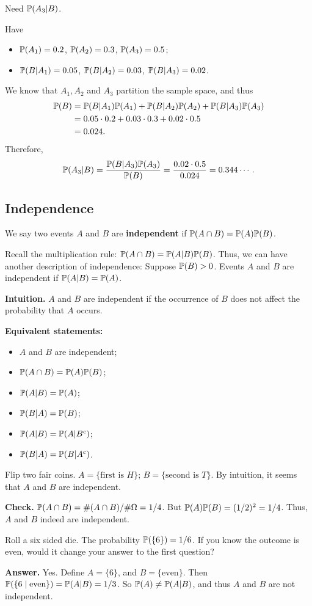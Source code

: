 Need $\mathbb{P}(A_3|B)$.

Have
\begin{itemize}
\item $\mathbb{P}(A_1) = 0.2$, $\mathbb{P}(A_2) = 0.3$, $\mathbb{P}(A_3) = 0.5$;
\item $\mathbb{P}(B|A_1) = 0.05$, $\mathbb{P}(B|A_2) = 0.03$, $\mathbb{P}(B|A_3) = 0.02$.
\end{itemize}
We know that $A_1,A_2$ and $A_3$ partition the sample space, and thus
\begin{align*}
  \mathbb{P}(B) & = \mathbb{P}(B|A_1)\mathbb{P}(A_1)+\mathbb{P}(B|A_2)\mathbb{P}(A_2) + \mathbb{P}(B|A_3)\mathbb{P}(A_3)\\
         & = 0.05\cdot 0.2 + 0.03\cdot 0.3 + 0.02 \cdot 0.5\\
  & = 0.024.
\end{align*}
Therefore,
\[
  \mathbb{P}(A_3|B) = \frac{\mathbb{P}(B|A_3)\mathbb{P}(A_3)}{\mathbb{P}(B)} = \frac{0.02\cdot 0.5}{0.024} = 0.344\cdots.
\]
\subsection{Independence}
\label{subsec:indep}
\begin{definition}
  We say two events $A$ and $B$ are \textbf{independent} if $\mathbb{P}(A\cap B) = \mathbb{P}(A)\mathbb{P}(B)$.
\end{definition}
Recall the multiplication rule: $\mathbb{P}(A\cap B) = \mathbb{P}(A|B) \mathbb{P}(B)$. Thus, we can
have another description of independence: Suppose $\mathbb{P}(B)>0$. Events $A$ and $B$
are independent if $\mathbb{P}(A|B) = \mathbb{P}(A)$.

\textbf{Intuition.} $A$ and $B$ are independent if the occurrence of $B$ does
not affect the probability that $A$ occurs.

\textbf{Equivalent statements:}
\begin{itemize}
\item $A$ and $B$ are independent;
\item $\mathbb{P}(A\cap B) = \mathbb{P}(A)\mathbb{P}(B)$;
\item $\mathbb{P}(A|B) = \mathbb{P}(A)$;
\item $\mathbb{P}(B|A) = \mathbb{P}(B)$;
\item $\mathbb{P}(A|B) = \mathbb{P}(A|B^c)$;
\item $\mathbb{P}(B|A) = \mathbb{P}(B|A^c)$.
\end{itemize}
\begin{example}
  Flip two fair coins. $A=\{\text{first is $H$}\}$; $B=\{\text{second is
    $T$}\}$. By intuition, it seems that $A$ and $B$ are independent.
\end{example}
\textbf{Check.} $\mathbb{P}(A\cap B) = \# (A\cap B)/\# \Omega = 1/4$. But $\mathbb{P}(A)
\mathbb{P}(B) = (1/2)^2 = 1/4$. Thus, $A$ and $B$ indeed are independent.
\begin{example}
  Roll a six sided die. The probability $\mathbb{P}(\{6\})=1/6$. If you know the
  outcome is even, would it change your answer to the first question?
\end{example}
\textbf{Answer.} Yes. Define $A = \{6\}$, and $B=\{\text{even}\}$. Then
$\mathbb{P}(\{6\mid \text{even}\}) =\mathbb{P}(A|B) =  1/3$. So $\mathbb{P}(A) \neq \mathbb{P}(A|B)$, and
thus $A$ and $B$ are not independent.

